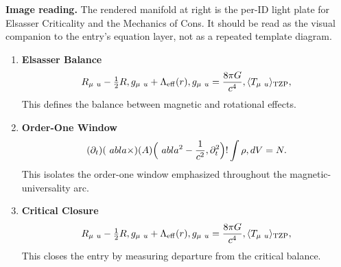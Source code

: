 \begin{samepage}
\noindent\begin{minipage}[t]{0.45\linewidth}
\vspace{0pt}
\raggedright
\scriptsize\textbf{Image reading.} The rendered manifold at right is the per-ID light plate for Elsasser Criticality and the Mechanics of Cons. It should be read as the visual companion to the entry's equation layer, not as a repeated template diagram.\par
\end{minipage}\hfill
\begin{minipage}[t]{0.53\linewidth}
\vspace*{-0.10in}
\raggedright
{}
\end{minipage}
\end{samepage}

\clearpage


\begin{enumerate}[leftmargin=1.6em,itemsep=9pt,topsep=6pt]
\item \textbf{Elsasser Balance}
\[
R_{\mu\\\ u} - \tfrac{1}{2}R\\,g_{\mu\\\ u} + \Lambda_{\mathrm{eff}}(r)\\,g_{\mu\\\ u} = \frac{8\pi G}{c^4}\\,\langle T_{\mu\\\ u}\rangle_{\mathrm{TZP}},
\]
This defines the balance between magnetic and rotational effects.

\item \textbf{Order-One Window}
\[
(\partial_t)(\ abla\times)(A)\Bigl(\ abla^2 - \frac{1}{c^2}\\,\partial_t^2\Bigr)\\!\int \rho\\\\,dV = N.
\]
This isolates the order-one window emphasized throughout the magnetic-universality arc.

\item \textbf{Critical Closure}
\[
R_{\mu\\\ u} - \tfrac{1}{2}R\\,g_{\mu\\\ u} + \Lambda_{\mathrm{eff}}(r)\\,g_{\mu\\\ u} = \frac{8\pi G}{c^4}\\,\langle T_{\mu\\\ u}\rangle_{\mathrm{TZP}},
\]
This closes the entry by measuring departure from the critical balance.
\end{enumerate}

